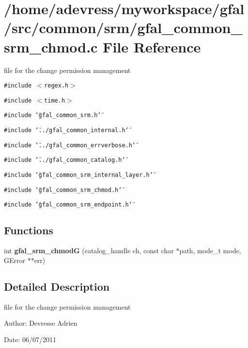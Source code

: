 \section{/home/adevress/myworkspace/gfal/src/common/srm/gfal\_\-common\_\-srm\_\-chmod.c File Reference}
\label{gfal__common__srm__chmod_8c}
file for the change permission management 

{\tt \#include $<$regex.h$>$}\par
{\tt \#include $<$time.h$>$}\par
{\tt \#include \char`\"{}gfal\_\-common\_\-srm.h\char`\"{}}\par
{\tt \#include \char`\"{}../gfal\_\-common\_\-internal.h\char`\"{}}\par
{\tt \#include \char`\"{}../gfal\_\-common\_\-errverbose.h\char`\"{}}\par
{\tt \#include \char`\"{}../gfal\_\-common\_\-catalog.h\char`\"{}}\par
{\tt \#include \char`\"{}gfal\_\-common\_\-srm\_\-internal\_\-layer.h\char`\"{}}\par
{\tt \#include \char`\"{}gfal\_\-common\_\-srm\_\-chmod.h\char`\"{}}\par
{\tt \#include \char`\"{}gfal\_\-common\_\-srm\_\-endpoint.h\char`\"{}}\par
\subsection*{Functions}
\begin{CompactItemize}
\item 
int \textbf{gfal\_\-srm\_\-chmod\-G} (catalog\_\-handle ch, const char $\ast$path, mode\_\-t mode, GError $\ast$$\ast$err)\label{gfal__common__srm__chmod_8c_fd872388d22b732b6e1c9bcee8e3aa18}

\end{CompactItemize}


\subsection{Detailed Description}
file for the change permission management 

\begin{Desc}
\item[Author:]Devresse Adrien \end{Desc}
\begin{Desc}
\item[Date:]06/07/2011 \end{Desc}

